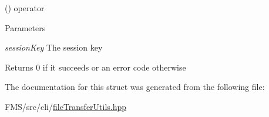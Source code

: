 () operator 


\begin{DoxyParams}{Parameters}
\item[{\em sessionKey}]The session key \end{DoxyParams}
\begin{DoxyReturn}{Returns}
0 if it succeeds or an error code otherwise 
\end{DoxyReturn}


The documentation for this struct was generated from the following file:\begin{DoxyCompactItemize}
\item 
FMS/src/cli/\hyperlink{fileTransferUtils_8hpp}{fileTransferUtils.hpp}\end{DoxyCompactItemize}
